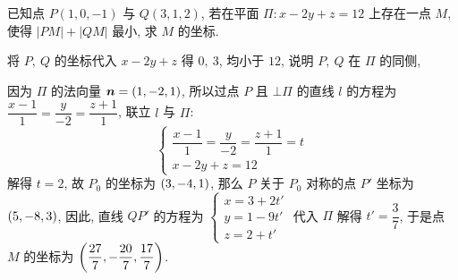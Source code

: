 \begin{example}
    已知点 $P(1,0,-1)$ 与 $Q(3,1,2)$, 若在平面 $\varPi:x-2y+z=12$ 上存在一点 $M$, 使得 $|PM|+|QM|$ 最小, 求 $M$ 的坐标.
\end{example}
\begin{solution}
    将 $P,~Q$ 的坐标代入 $x-2y+z$ 得 $0,~3$, 均小于 $12$, 说明 $P,~Q$ 在 $\varPi$ 的同侧,
    \begin{multicols}{2}
         因为 $\varPi$ 的法向量 $\vb*{n}=\qty(1,-2,1)$, 所以过点 $P$ 且 $\bot \varPi$ 的直线 $l$ 的方程为 $\dfrac{x-1}{1}=\dfrac{y}{-2}=\dfrac{z+1}{1}$, 联立 $l$ 与 $\varPi$:$$
        \begin{cases}
            \dfrac{x-1}{1}=\dfrac{y}{-2}=\dfrac{z+1}{1}=t \\ 
            x-2y+z=12
        \end{cases}
        $$
        解得 $t=2$, 故 $P_0$ 的坐标为 $\qty(3,-4,1)$, 那么 $P$ 关于 $P_0$ 对称的点 $P'$ 坐标为 $\qty(5,-8,3)$, 因此, 直线 $QP'$ 的方程为 $\begin{cases}
            x=3+2t'\\ y=1-9t'\\ z=2+t'
        \end{cases}$
        代入 $\varPi$ 解得 $t'=\dfrac{3}{7}$, 于是点 $M$ 的坐标为 $\qty(\dfrac{27}{7},-\dfrac{20}{7},\dfrac{17}{7})$.
    \begin{figure}[H]
        \centering
        


\begin{tikzpicture}[x=0.75pt,y=0.75pt,yscale=-1,xscale=1]


\end{tikzpicture}
\end{figure}
\end{multicols}
\end{solution}
